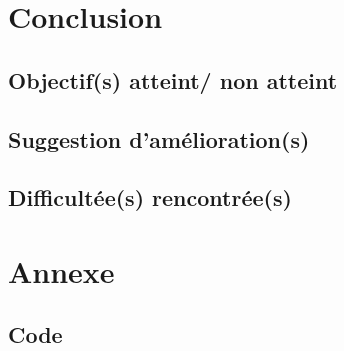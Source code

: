 \documentclass[a4paper, 12pt, french]{article}
\begin{document}
	\section{Conclusion}
	\subsection{Objectif(s) atteint/ non atteint}
	\subsection{Suggestion d'amélioration(s)}
	\subsection{Difficultée(s) rencontrée(s)}

	\section{Annexe}
	\subsection{Code}

	\printbibliography
\end{document}
